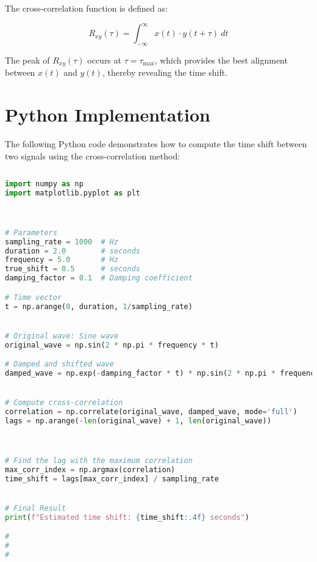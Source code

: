 \documentclass{article}
\begin{document}
	The cross-correlation function is defined as:
	
	\[
	R_{xy}(\tau) = \int_{-\infty}^{\infty} x(t) \cdot y(t + \tau) \ dt
	\]
	
	The peak of \( R_{xy}(\tau) \) occurs at \( \tau = \tau_{\text{max}} \), which provides the best alignment between \( x(t) \) and \( y(t) \), thereby revealing the time shift.
	
	
	\newpage
	
	\section*{Python Implementation}
	
	The following Python code demonstrates how to compute the time shift between two signals using the cross-correlation method:
	
\vspace{10pt}
	\begin{lstlisting}[language=Python, caption=Compute time shift using cross-correlation]
		
import numpy as np
import matplotlib.pyplot as plt



# Parameters
sampling_rate = 1000  # Hz
duration = 2.0        # seconds
frequency = 5.0       # Hz
true_shift = 0.5      # seconds
damping_factor = 0.1  # Damping coefficient

# Time vector
t = np.arange(0, duration, 1/sampling_rate)


# Original wave: Sine wave
original_wave = np.sin(2 * np.pi * frequency * t)

# Damped and shifted wave
damped_wave = np.exp(-damping_factor * t) * np.sin(2 * np.pi * frequency * (t - true_shift))


# Compute cross-correlation
correlation = np.correlate(original_wave, damped_wave, mode='full')
lags = np.arange(-len(original_wave) + 1, len(original_wave))



# Find the lag with the maximum correlation
max_corr_index = np.argmax(correlation)
time_shift = lags[max_corr_index] / sampling_rate


# Final Result
print(f"Estimated time shift: {time_shift:.4f} seconds")

#
#
#
  
  
 
\end{lstlisting}

\newpage
\vspace{10pt}
\end{document}
